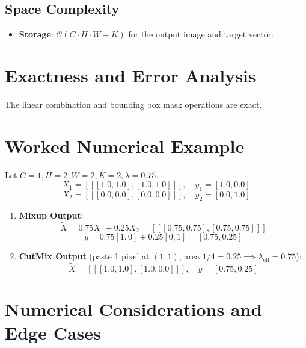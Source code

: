 \documentclass[11pt,a4paper]{article}
\theoremstyle{definition}
\begin{document}
\subsection{Space Complexity}
\begin{itemize}
    \item \textbf{Storage}: $\mathcal{O}(C \cdot H \cdot W + K)$ for the output image and target vector.
\end{itemize}

\section{Exactness and Error Analysis}

The linear combination and bounding box mask operations are exact.

\section{Worked Numerical Example}

Let $C = 1, H = 2, W = 2, K = 2, \lambda = 0.75$.
\begin{equation}
X_1 = [[[1.0, 1.0], [1.0, 1.0]]], \quad y_1 = [1.0, 0.0]
\end{equation}
\begin{equation}
X_2 = [[[0.0, 0.0], [0.0, 0.0]]], \quad y_2 = [0.0, 1.0]
\end{equation}

\begin{enumerate}
    \item \textbf{Mixup Output}:
    \begin{equation}
    \tilde{X} = 0.75 X_1 + 0.25 X_2 = [[[0.75, 0.75], [0.75, 0.75]]]
    \end{equation}
    \begin{equation}
    \tilde{y} = 0.75 [1, 0] + 0.25 [0, 1] = [0.75, 0.25]
    \end{equation}
    \item \textbf{CutMix Output} (paste 1 pixel at $(1, 1)$, area $1/4 = 0.25 \implies \lambda_{\text{eff}} = 0.75$):
    \begin{equation}
    \tilde{X} = [[[1.0, 1.0], [1.0, 0.0]]], \quad \tilde{y} = [0.75, 0.25]
    \end{equation}
\end{enumerate}

\section{Numerical Considerations and Edge Cases}
\end{document}
